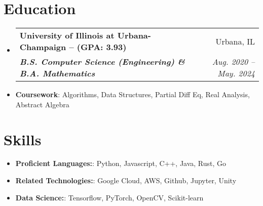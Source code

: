 \documentclass[letterpaper,11pt]{article}
\makeatletter
\newcommand{\resumeItem}[2]{
  \item\small{
    \textbf{#1}{: #2 \vspace{-2pt}}
  }
}
\newcommand{\resumeSubheading}[4]{
  \vspace{-1pt}\item
    \begin{tabular*}{0.97\textwidth}{l@{\extracolsep{\fill}}r}
      \textbf{#1} & #2 \\
      \textit{\small#3} & \textit{\small #4} \\
    \end{tabular*}\vspace{-5pt}
}
\newcommand{\resumeSubItem}[2]{\resumeItem{#1}{#2}\vspace{-4pt}}
\newcommand{\resumeSubHeadingListStart}{\begin{itemize}[leftmargin=1mm]}
\newcommand{\resumeSubHeadingListEnd}{\end{itemize}}
\makeatother
\begin{document}
\centerline{
    }


\section{Education}
  \resumeSubHeadingListStart
  \renewcommand\labelitemi{}
    \resumeSubheading
      {University of Illinois at Urbana-Champaign -- (GPA: 3.93)}{Urbana, IL}
      {\textbf{B.S. Computer Science (Engineering) \& B.A. Mathematics}}{Aug. 2020 -- May. 2024}
  \resumeSubHeadingListEnd

 \resumeSubHeadingListStart
  \renewcommand\labelitemi{}
    \resumeSubItem {Coursework}{Algorithms, Data Structures,
  Partial Diff Eq, Real Analysis, Abstract Algebra}
   \resumeSubHeadingListEnd
 
\section{Skills}
 \resumeSubHeadingListStart
 \renewcommand\labelitemi{}
   \resumeSubItem{Proficient Languages:}{ Python, Javascript, C++, Java, Rust, Go}
   \resumeSubItem{Related Technologies:}{ Google Cloud, AWS, Github, Jupyter, Unity}
   \resumeSubItem{Data Science:}{Tensorflow, PyTorch, OpenCV, Scikit-learn}
 \resumeSubHeadingListEnd

\end{document}
